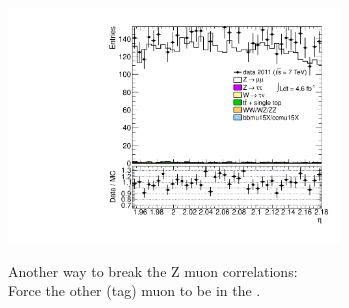 {\includegraphics[width=0.66\textwidth]{dates/20130306/figures/etaphi/Znjets_10_A_stack_lN_eta_ALL.pdf} 
\cole
}

 {
Another way to break the Z muon correlations: \\
Force the other (tag) muon to be in the .
}
